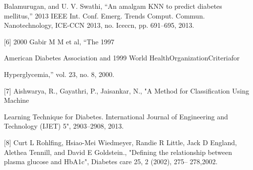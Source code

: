\documentclass[conference]{IEEEtran}
\begin{document}
	Balamurugan, and U. V. Swathi, “An amalgam KNN to predict diabetes mellitus,” 2013 IEEE Int. Conf. Emerg. Trends Comput. Commun. Nanotechnology, ICE-CCN 2013, no. Iceccn, pp. 691–695, 2013.
	
	[6]	2000  Gabir  M  M  et  al,  “The  1997
	
	American Diabetes Association and 1999 World
	HealthOrganizationCriteriafor
	
	Hyperglycemia,” vol. 23, no. 8, 2000.
	
	[7]	Aishwarya, R., Gayathri, P., Jaisankar, N., "A Method for Classification Using Machine
	
	Learning Technique for Diabetes. International Journal of Engineering and Technology (IJET) 5", 2903–2908, 2013.
	
	[8]	Curt L Rohlfing, Hsiao-Mei Wiedmeyer, Randie R Little, Jack D England, Alethea Tennill, and David E Goldstein., "Defining the relationship between plasma glucose and HbA1c", Diabetes care 25, 2 (2002), 275– 278,2002.
	
\end{document}
